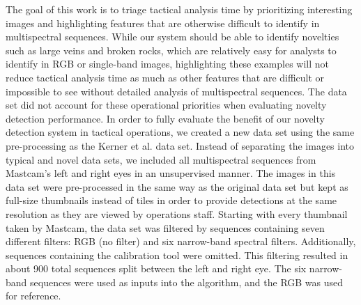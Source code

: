 The goal of this work is to triage tactical analysis time by prioritizing interesting images and highlighting features that are otherwise difficult to identify in multispectral sequences.
While our system should be able to identify novelties such as large veins and broken rocks, which are relatively easy for analysts to identify in RGB or single-band images, highlighting these examples will not reduce tactical analysis time as much as other features that are difficult or impossible to see without detailed analysis of multispectral sequences. 
The \cite{kerner2020comparison} data set did not account for these operational priorities when evaluating novelty detection performance. 
In order to fully evaluate the benefit of our novelty detection system in tactical operations, we created a new data set using the same pre-processing as the Kerner et al. data set. 
Instead of separating the images into typical and novel data sets, we included all multispectral sequences from Mastcam's left and right eyes in an unsupervised manner.
The images in this data set were pre-processed in the same way as the original data set but kept as full-size thumbnails instead of tiles in order to provide detections at the same resolution as they are viewed by operations staff. 
Starting with every thumbnail taken by Mastcam, the data set was filtered by sequences containing seven different filters: RGB (no filter) and six narrow-band spectral filters.
Additionally, sequences containing the calibration tool were omitted. 
This filtering resulted in about 900 total sequences split between the left and right eye. 
The six narrow-band sequences were used as inputs into the algorithm, and the RGB was used for reference.
